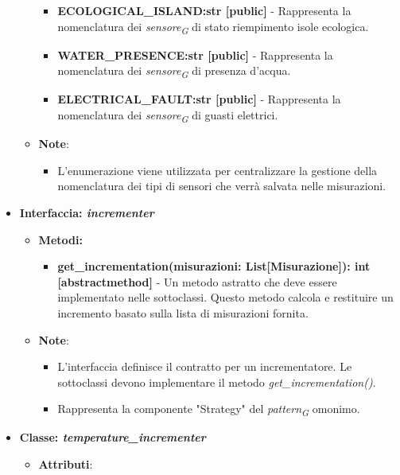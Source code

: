 \begin{itemize}
\begin{itemize}
\begin{itemize}
                \item \textbf{ECOLOGICAL\_ISLAND:str [public]} - Rappresenta la nomenclatura dei \textit{sensore}\textsubscript{\textit{G}} di stato riempimento isole ecologica.
                \item \textbf{WATER\_PRESENCE:str [public]} - Rappresenta la nomenclatura dei \textit{sensore}\textsubscript{\textit{G}} di presenza d'acqua.
                \item \textbf{ELECTRICAL\_FAULT:str [public]} - Rappresenta la nomenclatura dei \textit{sensore}\textsubscript{\textit{G}} di guasti elettrici.
            \end{itemize}

            \item \textbf{Note}:
            \begin{itemize}
                \item L'enumerazione viene utilizzata per centralizzare la gestione della nomenclatura dei tipi di sensori che verrà salvata nelle misurazioni.
            \end{itemize}
        \end{itemize}
\item \textbf{Interfaccia: \textit{incrementer}}
    \begin{itemize}
    \item \textbf{Metodi: }
    \begin{itemize}
        \item \textbf{get\_incrementation(misurazioni: List[Misurazione]): int [abstractmethod]} - Un metodo astratto che deve essere implementato nelle sottoclassi. Questo metodo calcola e restituire un incremento basato sulla lista di misurazioni fornita.
    \end{itemize}
    \item\textbf{Note}:
        \begin{itemize}
            \item L'interfaccia definisce il contratto per un incrementatore. Le sottoclassi devono implementare il metodo \textit{get\_incrementation()}.
            \item Rappresenta la componente "Strategy" del \textit{pattern}\textsubscript{\textit{G}} omonimo.
        \end{itemize}
    \end{itemize}
    \item \textbf{Classe: \textit{temperature\_incrementer}}
    \begin{itemize}
    \item \textbf{Attributi}:

\end{itemize}
\end{itemize}
